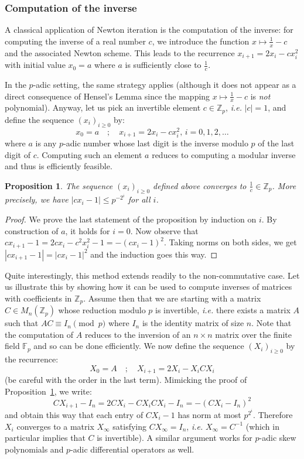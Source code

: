 \documentclass[11pt]{article}
\numberwithin{equation}{section}
\numberwithin{figure}{section}
\renewcommand{\leq}{\leqslant}
\renewcommand{\geq}{\geqslant}
\newtheorem{prop}[theo]{Proposition}
\theoremstyle{definition}
\newcommand{\Z}{\mathbb Z}
\newcommand{\Zp}{\Z_p}
\newcommand{\F}{\mathbb F}
\newcommand{\Fp}{\F_p}
\begin{document}
\subsubsection{Computation of the inverse}
\label{sssec:inverse}

A classical application of Newton iteration is the computation of the 
inverse: for computing the inverse of a real number $c$, we introduce 
the function $x \mapsto \frac 1 x - c$ and the associated Newton scheme. 
This leads to the recurrence $x_{i+1} = 2 x_i - c x_i^2$ with initial 
value $x_0 = a$ where $a$ is sufficiently close to $\frac 1 c$.

In the $p$-adic setting, the same strategy applies (although it does not 
appear as a direct consequence of Hensel's Lemma since the mapping $x 
\mapsto \frac 1 x - c$ is \emph{not} polynomial). Anyway, let us pick 
an invertible element $c \in \Zp$, \emph{i.e.} $|c| = 1$, and define the
sequence $(x_i)_{i \geq 0}$ by:
$$x_0 = a \quad ; \quad x_{i+1} = 2 x_i - c x_i^2, \, i = 0, 1, 2, \ldots$$
where $a$ is any $p$-adic number whose last digit is the inverse modulo
$p$ of the last digit of $c$. Computing such an element $a$ reduces to
computing a modular inverse and thus is efficiently feasible.

\begin{prop}
\label{prop:Newtoninverse}
The sequence $(x_i)_{i \geq 0}$ defined above converges to $\frac 1 c 
\in \Zp$. More precisely, we have $|c x_i - 1| \leq p^{-2^i}$ for all 
$i$.
\end{prop}

\begin{proof}
We prove the last statement of the proposition by induction on $i$. By
construction of $a$, it holds for $i = 0$. Now observe that
$c x_{i+1} - 1 = 2 c x_i - c^2 x_i^2 - 1 = - (c x_i - 1)^2$.
Taking norms on both sides, we get $|c x_{i+1} - 1| = |c x_i - 1|^2$
and the induction goes this way.
\end{proof}

Quite interestingly, this method extends readily to 
the non-commutative case. Let us illustrate this by showing how it can be 
used to compute inverses of matrices with coefficients in $\Zp$. Assume
then that we are starting with a matrix $C \in M_n(\Zp)$ whose reduction
modulo $p$ is invertible, \emph{i.e.} there exists a matrix $A$ such
that $AC \equiv I_n \pmod p$ where $I_n$ is the identity matrix of 
size $n$. Note that the computation of $A$ reduces to the inversion 
of an $n \times n$ matrix over the finite field $\Fp$ and so can be 
done efficiently.
We now define the sequence $(X_i)_{i \geq 0}$ by the recurrence:
$$X_0 = A \quad ; \quad X_{i+1} = 2 X_i - X_i C X_i$$
(be careful with the order in the last term). Mimicking the proof of
Proposition~\ref{prop:Newtoninverse}, we write:
$$C X_{i+1} - I_n = 2 C X_i - C X_i C X_i - I_n = - (C X_i - I_n)^2$$
and obtain this way that each entry of $C X_i - 1$ has norm at most
$p^{2^i}$. Therefore $X_i$ converges to a matrix $X_\infty$ satisfying
$C X_\infty = I_n$, \emph{i.e.} $X_\infty = C^{-1}$ (which in particular
implies that $C$ is invertible). A similar argument works for $p$-adic 
skew polynomials and $p$-adic differential operators as well.
\end{document}
